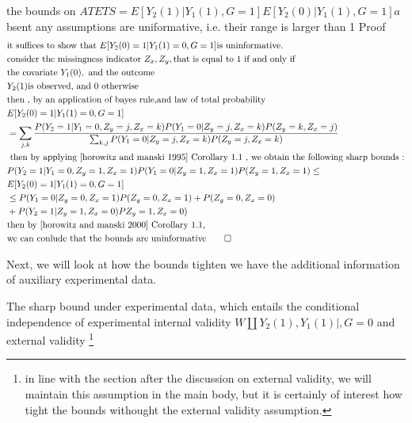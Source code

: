\documentclass{article}
\begin{document}
\begin{theorem}
 the bounds on $ATETS = E[ Y_2(1) | Y_1(1) , G =1 ]  E[ Y_2(0) | Y_1(1), G =1] a$bsent any assumptions are uniformative, i.e. their range is larger than 1
 Proof \\
\begin{align}
&\text{it suffices to show that } E[ Y_2(0) =1| Y_1(1)=0, G=1] \text{is uninformative.}\\ 
&\text{consider the missingness indicator } Z_x, Z_y, \text{that is equal to 1 if and only if } \\
&\text{the covariate }Y_1(0),\text{ and the outcome} \\
&Y_2(1) \text{is observed, and 0 otherwise} \\
&\text{then , by an application of bayes rule,and law of total probability}\\
&E[ Y_2(0)=1 | Y_1(1)=0, G=1] \\
&= \sum_{j,k} \frac{ P (Y_2 =1 | Y_1 = 0 , Z_y = j, Z_ x = k ) P ( Y_1 = 0 | Z_y =j,Z_ x =k ) P( Z_y = k, Z_x = j) }{ \sum_{ k, j} P( Y_1 = 0 | Z_y = j, Z_x = k ) P (Z_y = j, Z_x = k) }\\
&\text{ then by applying \cite{horowitz and manski 1995} Corollary 1.1 , we obtain the following sharp bounds :} \\
& P(Y_2 =1 | Y_1 =0, Z_y =1, Z_ x =1 ) P( Y_1 = 0 | Z_y =1, Z_x = 1 )P( Z_y = 1, Z_x =1) \leq \\
& E[ Y_2(0)=1 | Y_1(1)=0, G=1] \\
&\leq P( Y_1 = 0 | Z_y = 0 ,Z_x = 1) P( Z_y = 0 , Z_x =1 ) + P( Z_y = 0, Z _ x = 0) \\
&+ P( Y_2 =1 | Z_y = 1, Z_ x =0) P  Z_ y =1, Z_x = 0)  \\
&\text{then by \cite{horowitz and manski 2000} Corollary 1.1,}\\
&\text{we can conlude that the bounds are uninformative} \qed 
\end{align} 
\end{theorem}





Next, we will look at how the bounds tighten we have the additional information of auxiliary experimental data. 

The sharp bound under experimental data, which entails the conditional independence of experimental internal validity $ W \amalg Y_2(1), Y_1(1) | ,G=0$ and external validity \footnote{in line with the section after the discussion on external validity, we will maintain this assumption in the main body, but it is certainly of interest how tight the bounds withought the external validity assumption.
}
\end{document}
